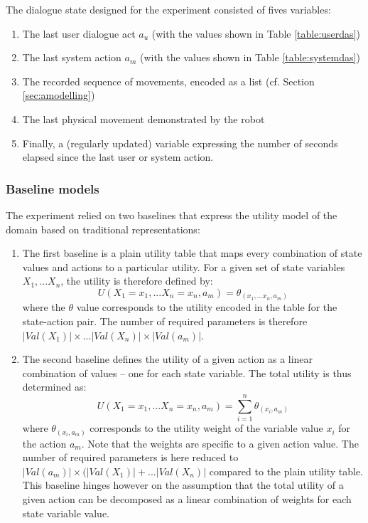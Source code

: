 The dialogue state designed for the experiment consisted of fives variables: \begin{enumerate}
\item The last user dialogue act $a_u$ (with the values shown in Table \ref{table:userdas})
\item The last system action $a_m$ (with the values shown in Table \ref{table:systemdas})
\item The recorded sequence of movements, encoded as a list (cf. Section \ref{sec:amodelling})
\item The last physical movement demonstrated by the robot
\item Finally, a (regularly updated) variable expressing the number of seconds elapsed since the last user or system action. 
\end{enumerate}

\subsubsection*{Baseline models}

The experiment relied on two baselines that express the utility model of the domain based on traditional representations: \begin{enumerate}
\item The first baseline is a plain utility table that maps every combination of state values and actions to a particular utility.  For a given set of state variables $X_1,...X_n$, 
the utility is therefore defined by: 
\begin{equation}
U(X_1=x_1,...X_n=x_n, a_m) = \theta_{(x_1,...x_n, a_m)}
\end{equation}
where the $\theta$ value corresponds to the utility encoded in the table for the state-action pair. The number of required parameters is therefore $|Val(X_1)| \times ... |Val(X_n)| \times |Val(a_m)|$. 
\item The second baseline defines the utility of a given action as a linear combination of values -- one for each state variable.  The total utility is thus determined as:
\begin{equation}
U(X_1=x_1,...X_n=x_n, a_m) = \sum_{i=1}^{n} \theta_{(x_i, a_m)}
\end{equation}
where $\theta_{(x_i, a_m)}$ corresponds to the utility weight of the variable value $x_i$ for the action $a_m$.  Note that the weights are specific to a given action value. The number of required parameters is here reduced to $|Val(a_m)| \times (|Val(X_1)| + ... |Val(X_n)|$ compared to the plain utility table.  This baseline hinges however on the assumption that the total utility of a given action can be decomposed as a linear combination of weights for each state variable value.
\end{enumerate}

